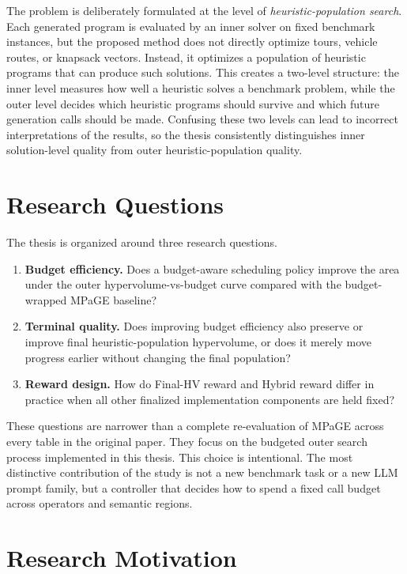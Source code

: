 The problem is deliberately formulated at the level of \emph{heuristic-population search}. Each generated program is evaluated by an inner solver on fixed benchmark instances, but the proposed method does not directly optimize tours, vehicle routes, or knapsack vectors. Instead, it optimizes a population of heuristic programs that can produce such solutions. This creates a two-level structure: the inner level measures how well a heuristic solves a benchmark problem, while the outer level decides which heuristic programs should survive and which future generation calls should be made. Confusing these two levels can lead to incorrect interpretations of the results, so the thesis consistently distinguishes inner solution-level quality from outer heuristic-population quality.

\section{Research Questions}

The thesis is organized around three research questions.

\begin{enumerate}
  \item \textbf{Budget efficiency.} Does a budget-aware scheduling policy improve the area under the outer hypervolume-vs-budget curve compared with the budget-wrapped MPaGE baseline?
  \item \textbf{Terminal quality.} Does improving budget efficiency also preserve or improve final heuristic-population hypervolume, or does it merely move progress earlier without changing the final population?
  \item \textbf{Reward design.} How do Final-HV reward and Hybrid reward differ in practice when all other finalized implementation components are held fixed?
\end{enumerate}

These questions are narrower than a complete re-evaluation of MPaGE across every table in the original paper. They focus on the budgeted outer search process implemented in this thesis. This choice is intentional. The most distinctive contribution of the study is not a new benchmark task or a new LLM prompt family, but a controller that decides how to spend a fixed call budget across operators and semantic regions.

\section{Research Motivation}

